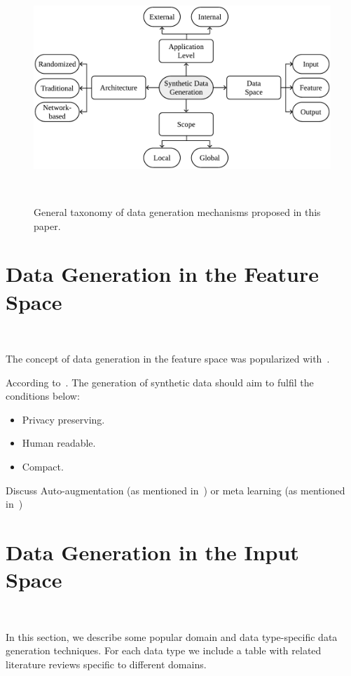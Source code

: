 \documentclass[parskip=full]{scrartcl}
\begin{document}
\begin{figure}
	\centering
	\includegraphics[width=.8\linewidth]{../analysis/data-generation-taxonomy}
    \caption{General taxonomy of data generation mechanisms proposed in this
        paper.
    }~\label{fig:data-generation-taxonomy}
\end{figure}


\section{Data Generation in the Feature Space}~\label{sec:feature-space}

The concept of data generation in the feature space was popularized
with~\cite{devries2017dataset}.

According to~\cite{assefa2020generating}. The generation of synthetic data
should aim to fulfil the conditions below:

\begin{itemize}
    \item Privacy preserving.
    \item Human readable.
    \item Compact.
\end{itemize}

Discuss Auto-augmentation (as mentioned in~\cite{wang2020survey}) or meta
learning (as mentioned in~\cite{shorten2019survey})

\section{Data Generation in the Input Space}~\label{sec:input-space}

In this section, we describe some popular domain and data type-specific data
generation techniques. For each data type we include a table with related
literature reviews specific to different domains.
\end{document}
